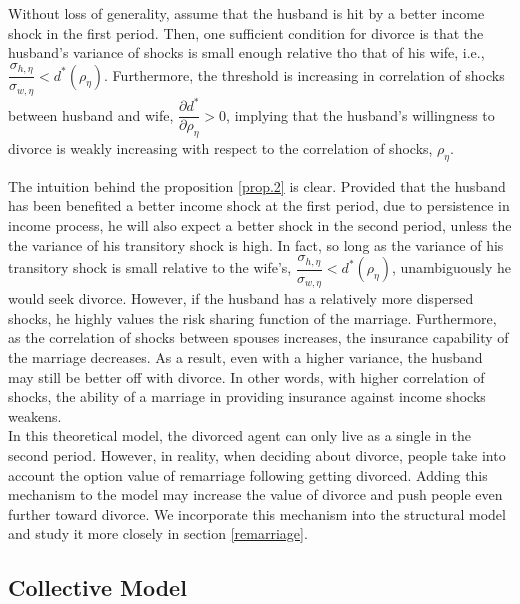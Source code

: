 \begin{prop}
Without loss of generality, assume that the husband is hit by a better income shock in the first period. Then, one sufficient condition for divorce is that the husband's variance of shocks is small enough relative tho that of his wife, i.e.,  \( \dfrac{\sigma_{h, \eta}}{\sigma_{w,\eta} } < d^*(\rho_\eta)\). Furthermore, the threshold is increasing in correlation of shocks between husband and wife,  \( \dfrac{\partial d^*}{\partial \rho_{\eta}} > 0\), implying that the husband's willingness to divorce is weakly increasing with respect to the correlation of shocks, $\rho_\eta$.  \label{prop.2}
\end{prop}

The intuition behind the proposition \eqref{prop.2} is clear. Provided that the husband has been benefited a better income shock at the first period, due to persistence in income process, he will also expect a better shock in the second period, unless the the variance of his transitory shock is high. In fact, so long as the variance of his transitory shock is small relative to the wife's,  \( \dfrac{\sigma_{h, \eta}}{\sigma_{w,\eta} } < d^*(\rho_\eta)\), unambiguously he would seek divorce. However, if the husband has a relatively more dispersed shocks, he highly values the risk sharing function of the marriage. Furthermore,  as the correlation of shocks between spouses increases, the insurance capability of the marriage decreases. As a result, even with a higher variance, the husband may still be better off with divorce. In other words, with higher correlation of shocks, the ability of a marriage in providing insurance against income shocks weakens.  \\

In this theoretical model, the divorced agent can only live as a single in the second period. However, in reality, when deciding about divorce, people take into account the option value of remarriage following getting divorced. Adding this mechanism to the model may increase the value of divorce and push people even further toward divorce. We incorporate this mechanism into the structural model and study it more closely in section \ref{remarriage}. 

\subsection{Collective Model}

